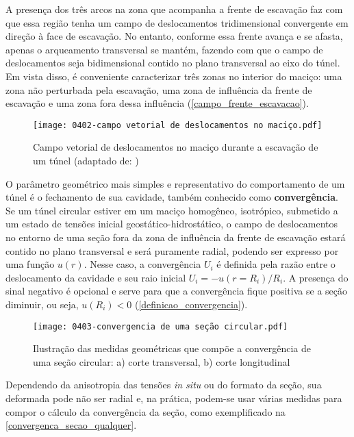 A presença dos três arcos na zona que acompanha a frente de escavação faz com que essa região tenha um campo de deslocamentos tridimensional convergente em direção à face de escavação. No entanto, conforme essa frente avança e se afasta, apenas o arqueamento transversal se mantém, fazendo com que o campo de deslocamentos seja bidimensional contido no plano transversal ao eixo do túnel. Em vista disso, é conveniente caracterizar três zonas no interior do maciço: uma zona não perturbada pela escavação, uma zona de influência da frente de escavação e uma zona fora dessa influência (\autoref{campo_frente_escavacao}).

\begin{figure}[H]
	\begin{center}
		\texttt{[image: 0402-campo vetorial de deslocamentos no maciço.pdf]}
	\end{center}
	\caption{\label{campo_frente_escavacao}Campo vetorial de deslocamentos no maciço durante a escavação de um túnel (adaptado de: )}
\end{figure}

O parâmetro geométrico mais simples e representativo do comportamento de um túnel é o fechamento de sua cavidade, também conhecido como \textbf{convergência}. Se um túnel circular estiver em um maciço homogêneo, isotrópico, submetido a um estado de tensões inicial geostático-hidrostático, o campo de deslocamentos no entorno de uma seção fora da zona de influência da frente de escavação estará contido no plano transversal e será puramente radial, podendo ser expresso por uma função  $u(r)$. Nesse caso, a convergência $U_i$ é definida pela razão entre o deslocamento da cavidade e seu raio inicial $U_i=-u(r=R_i)/R_i$. A presença do sinal negativo é opcional e serve para que a convergência fique positiva se a seção diminuir, ou seja, $u(R_i) < 0$  (\autoref{definicao_convergencia}).

\begin{figure}[H]
	\begin{center}
		\texttt{[image: 0403-convergencia de uma seção circular.pdf]}
	\end{center}
	\caption{\label{definicao_convergencia}Ilustração das medidas geométricas que compõe a convergência de uma seção circular: a) corte transversal, b) corte longitudinal}
\end{figure}

Dependendo da anisotropia das tensões \textit{in situ} ou do formato da seção, sua deformada pode não ser radial e, na prática, podem-se usar várias medidas para compor o cálculo da convergência da seção, como exemplificado na \autoref{convergenca_secao_qualquer}.

